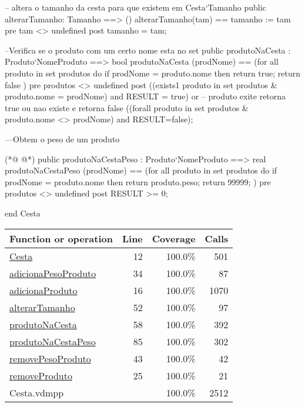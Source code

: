 \begin{vdmpp}[breaklines=true]
  -- altera o tamanho da cesta  para que existem em Cesta`Tamanho
  public alterarTamanho: Tamanho ==> ()
  alterarTamanho(tam)  == 
    tamanho := tam
  pre tam <> undefined
  post tamanho = tam; 
  
  --Verifica se o produto com um certo nome esta no set
  public produtoNaCesta : Produto`NomeProduto ==> bool
  produtoNaCesta (prodNome) == 
   (for all produto in set produtos
    do 
     if prodNome = produto.nome
       then return true;
    return false
   )
   pre produtos <> undefined
   post ((exists1 produto in set produtos & produto.nome = prodNome)  and   RESULT = true) or  --  produto exite retorna true ou nao existe e retorna false
      ((forall produto in set produtos & produto.nome <> prodNome) and RESULT=false); 
      
  ---Obtem o peso de um produto 
  
(*@
\label{produtoNaCestaPeso:85}
@*)
   public produtoNaCestaPeso : Produto`NomeProduto ==> real
   produtoNaCestaPeso (prodNome) == 
   (for all produto in set produtos
    do 
     if prodNome = produto.nome
       then return produto.peso;
    return 99999;
   )
   pre produtos <> undefined 
   post RESULT >= 0;
  
end Cesta
\end{vdmpp}
\bigskip
\begin{longtable}{|l|r|r|r|}
\hline
Function or operation & Line & Coverage & Calls \\
\hline
\hline
\hyperref[Cesta:12]{Cesta} & 12&100.0\% & 501 \\
\hline
\hyperref[adicionaPesoProduto:34]{adicionaPesoProduto} & 34&100.0\% & 87 \\
\hline
\hyperref[adicionaProduto:16]{adicionaProduto} & 16&100.0\% & 1070 \\
\hline
\hyperref[alterarTamanho:52]{alterarTamanho} & 52&100.0\% & 97 \\
\hline
\hyperref[produtoNaCesta:58]{produtoNaCesta} & 58&100.0\% & 392 \\
\hline
\hyperref[produtoNaCestaPeso:85]{produtoNaCestaPeso} & 85&100.0\% & 302 \\
\hline
\hyperref[removePesoProduto:43]{removePesoProduto} & 43&100.0\% & 42 \\
\hline
\hyperref[removeProduto:25]{removeProduto} & 25&100.0\% & 21 \\
\hline
\hline
Cesta.vdmpp & & 100.0\% & 2512 \\
\hline
\end{longtable}

